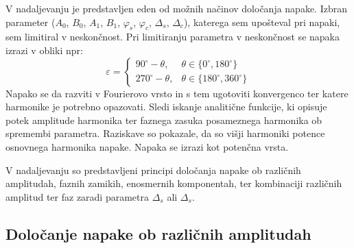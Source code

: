 \documentclass[a4paper]{article}
\begin{document}
V nadaljevanju je predstavljen eden od možnih načinov določanja napake. Izbran parameter ($A_0$, $B_0$, $A_1$, $B_1$, $\varphi_{s}$, $\varphi_{c}$, $\Delta_s$, $\Delta_c$), katerega sem upošteval pri napaki, sem limitiral v neskončnost. Pri limitiranju parametra v neskončnost se napaka izrazi v obliki npr:
\begin{equation}
\label{equ:def_err_inf}
\varepsilon=
\begin{cases}
90^\circ-\theta, & \theta \in \{0^\circ,180^\circ\}\\
270^\circ-\theta, & \theta \in \{180^\circ,360^\circ\}
\end{cases}
\end{equation}
Napako se da razviti v Fourierovo vrsto \cite{fourier} in s tem ugotoviti konvergenco ter katere harmonike je potrebno opazovati. Sledi iskanje analitične funkcije, ki opisuje potek amplitude harmonika ter faznega zasuka posameznega harmonika ob spremembi parametra. Raziskave so pokazale, da so višji harmoniki potence osnovnega harmonika napake. Napaka se izrazi kot potenčna vrsta.

V nadaljevanju so predstavljeni principi določanja napake ob različnih amplitudah, faznih zamikih, enosmernih komponentah, ter kombinaciji različnih amplitud ter faz zaradi parametra $\Delta_s$ ali $\Delta_s$.

\subsection{Določanje napake ob različnih amplitudah}
\end{document}
